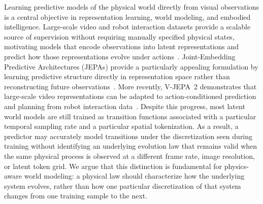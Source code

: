 \documentclass{article}
\theoremstyle{plain}
\theoremstyle{definition}
\theoremstyle{remark}
\begin{document}
Learning predictive models of the physical world directly from visual observations is a central objective in representation learning, world modeling, and embodied intelligence. Large-scale video and robot interaction datasets provide a scalable source of supervision without requiring manually specified physical states, motivating models that encode observations into latent representations and predict how those representations evolve under actions~\citep{ha2018worldmodels,hafner2019planet,hafner2020dreamer,hafner2023dreamerv3,hansen2024tdmpc2}. Joint-Embedding Predictive Architectures (JEPAs) provide a particularly appealing formulation by learning predictive structure directly in representation space rather than reconstructing future observations~\citep{lecun2022path,assran2023ijepa,bardes2024vjepa}. More recently, V-JEPA~2 demonstrates that large-scale video representations can be adapted to action-conditioned prediction and planning from robot interaction data~\citep{assran2025vjepa2}. Despite this progress, most latent world models are still trained as transition functions associated with a particular temporal sampling rate and a particular spatial tokenization. As a result, a predictor may accurately model transitions under the discretization seen during training without identifying an underlying evolution law that remains valid when the same physical process is observed at a different frame rate, image resolution, or latent token grid. We argue that this distinction is fundamental for physics-aware world modeling: a physical law should characterize how the underlying system evolves, rather than how one particular discretization of that system changes from one training sample to the next.
\end{document}
